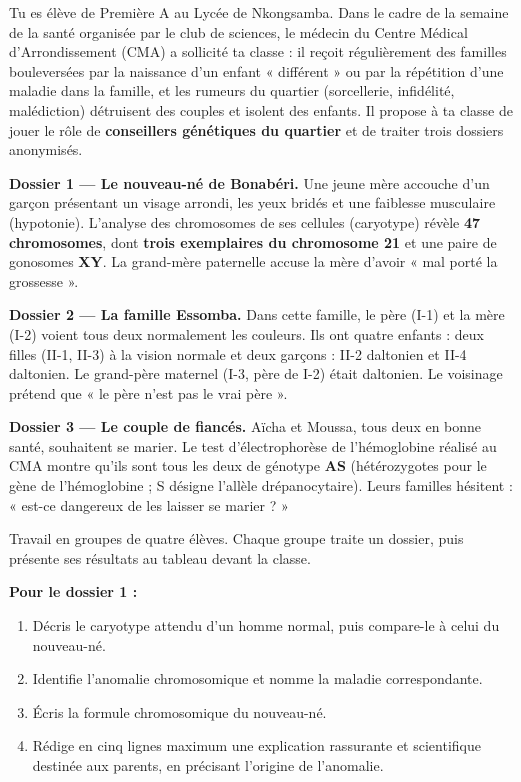\documentclass[11pt]{article}
\newcounter{popsec}
\newcounter{popsub}
\newcommand{\courssub}[1]{%
  \stepcounter{popsub}%
  \par\vspace{9pt}\noindent{\popxbold\fontsize{11.5}{13}\selectfont\color{popink}{\color{poporange}\thepopsec.\thepopsub}\hspace{6pt}#1}\par\nopagebreak\vspace{4pt}
}
\begin{document}
\courssub{Situation déclenchante}

Tu es élève de Première A au Lycée de Nkongsamba. Dans le cadre de la semaine de la santé organisée par le club de sciences, le médecin du Centre Médical d'Arrondissement (CMA) a sollicité ta classe : il reçoit régulièrement des familles bouleversées par la naissance d'un enfant « différent » ou par la répétition d'une maladie dans la famille, et les rumeurs du quartier (sorcellerie, infidélité, malédiction) détruisent des couples et isolent des enfants. Il propose à ta classe de jouer le rôle de \textbf{conseillers génétiques du quartier} et de traiter trois dossiers anonymisés.

\textbf{Dossier 1 — Le nouveau-né de Bonabéri.} Une jeune mère accouche d'un garçon présentant un visage arrondi, les yeux bridés et une faiblesse musculaire (hypotonie). L'analyse des chromosomes de ses cellules (caryotype) révèle \textbf{47 chromosomes}, dont \textbf{trois exemplaires du chromosome 21} et une paire de gonosomes \textbf{XY}. La grand-mère paternelle accuse la mère d'avoir « mal porté la grossesse ».

\textbf{Dossier 2 — La famille Essomba.} Dans cette famille, le père (I-1) et la mère (I-2) voient tous deux normalement les couleurs. Ils ont quatre enfants : deux filles (II-1, II-3) à la vision normale et deux garçons : II-2 daltonien et II-4 daltonien. Le grand-père maternel (I-3, père de I-2) était daltonien. Le voisinage prétend que « le père n'est pas le vrai père ».

\textbf{Dossier 3 — Le couple de fiancés.} Aïcha et Moussa, tous deux en bonne santé, souhaitent se marier. Le test d'électrophorèse de l'hémoglobine réalisé au CMA montre qu'ils sont tous les deux de génotype \textbf{AS} (hétérozygotes pour le gène de l'hémoglobine ; S désigne l'allèle drépanocytaire). Leurs familles hésitent : « est-ce dangereux de les laisser se marier ? »

\courssub{Consignes}

Travail en groupes de quatre élèves. Chaque groupe traite un dossier, puis présente ses résultats au tableau devant la classe.

\textbf{Pour le dossier 1 :}
\begin{enumerate}
\item Décris le caryotype attendu d'un homme normal, puis compare-le à celui du nouveau-né.
\item Identifie l'anomalie chromosomique et nomme la maladie correspondante.
\item Écris la formule chromosomique du nouveau-né.
\item Rédige en cinq lignes maximum une explication rassurante et scientifique destinée aux parents, en précisant l'origine de l'anomalie.
\end{enumerate}
\end{document}
